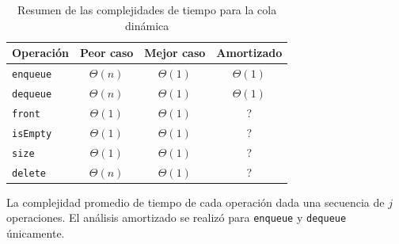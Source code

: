 \begin{table}[htbp]
  \centering{}
  \begin{threeparttable}
    \begin{tabular}{lccc}
      \toprule
      Operación & Peor caso & Mejor caso & Amortizado\tnote{a} \\
      \midrule
      \texttt{enqueue} & $\Theta{} (n)$ & $\Theta{} (1)$ & $\Theta{} (1)$ \\
      \texttt{dequeue} & $\Theta{} (n)$ & $\Theta{} (1)$ & $\Theta{} (1)$ \\
      \texttt{front} & $\Theta{} (1)$ & $\Theta{} (1)$ & ? \\
      \texttt{isEmpty} & $\Theta{} (1)$ & $\Theta{} (1)$ & ? \\
      \texttt{size} & $\Theta{} (1)$ & $\Theta{} (1)$ & ? \\
      \texttt{delete} & $\Theta{} (n)$ & $\Theta{} (1)$ & ? \\
      \bottomrule
    \end{tabular}
    \begin{tablenotes}[flushleft]
      \footnotesize
      \item[a] La complejidad promedio de tiempo de cada operación dada una secuencia de $j$ operaciones. El análisis amortizado se realizó para \texttt{enqueue} y \texttt{dequeue} únicamente.
    \end{tablenotes}
  \end{threeparttable}
  \caption{Resumen de las complejidades de tiempo para la cola dinámica}
  \label{tab:resumen-cola-dinámica}
\end{table}

